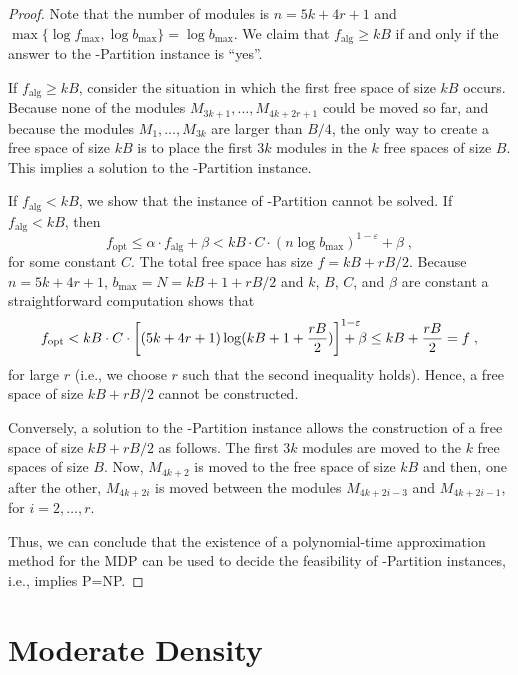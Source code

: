 \documentclass{article}
\newcommand{\NP}{NP}
\newcommand{\POL}{P}
\def\fmax{f_{\mathrm{max}}}
\def\bmax{b_{\mathrm{max}}}
\def\falg{f_{\mathrm{alg}}}
\def\fopt{f_{\mathrm{opt}}}
\begin{document}
\begin{proof}
Note that the number of modules is $n= 5k + 4r +1$ and $\max\{\log\fmax,\log\bmax\} =
\log\bmax$. We claim that $\falg \geq kB$ if and only if the answer
to the {-Partition} instance is ``yes''.

If $\falg \geq kB$, consider the situation in which the first free
space of size $kB$ occurs. Because none of the modules
$M_{3k+1},\ldots,M_{4k+2r+1}$ could be moved so far, and because
the modules $M_{1},\ldots,M_{3k}$ are larger than $B/4$, the only
way to create a free space of size $kB$ is to place the first $3k$
modules in the $k$ free spaces of size $B$. This implies a solution to
the {-Partition} instance.

If $\falg < kB$, we show that the 
instance of {-Partition} 
cannot be solved. If $\falg < kB$, then
$$
\fopt \leq \alpha \cdot \falg + \beta <
kB \cdot C \cdot ( n \log \bmax )^{1-\varepsilon} + \beta \; ,
$$
for some constant $C$. The total free space has size $f = kB +
rB/2$. Because $n =5k + 4r +1$, $\bmax = N = kB + 1 + rB/2$ and
$k$, $B$, $C$, and $\beta$ are constant a straightforward
computation shows that
$$
\fopt < kB \cdot C \cdot \left[ (5k+4r+1) \log (kB + 1 +
\frac{rB}{2}) \right]^{1-\varepsilon} \hspace{-0.5cm} + \beta \leq
kB + \frac{rB}{2} = f \; ,
$$
for large $r$ (i.e., we choose $r$ such that the second inequality
holds).
Hence, a free space of size $kB + rB/2$ cannot be
constructed.

Conversely, a solution to the {-Partition} instance allows the construction of a
free space of size $kB + rB/2$ as follows. The first $3k$ modules
are moved to the $k$ free spaces of size $B$. Now, $M_{4k+2}$ is
moved to the free space of size $kB$ and then, one after the other,
$M_{4k+2i}$ is moved between the modules $M_{4k+2i-3}$ and
$M_{4k+2i-1}$, for $i=2,\ldots,r$.

Thus, we can conclude that the existence of a polynomial-time approximation 
method for the MDP can be used to decide the feasibility of {-Partition} instances,
i.e., implies \POL=\NP.
\end{proof}













\section{Moderate Density}
\label{sec:dense} 
\end{document}
